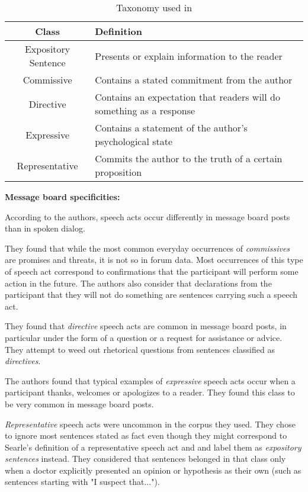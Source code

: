 \documentclass[11pt]{article}
\begin{document}
\begin{table}
	\begin{tabularx}{\textwidth}{c l}
		\toprule
		Class & Definition \\
		\midrule
		Expository Sentence & Presents or explain information to the reader \\
		\midrule
		Commissive & Contains a stated commitment from the author \\
		Directive & Contains an expectation that readers will do something as a response \\
		Expressive & Contains a statement of the author's psychological state \\
		Representative & Commits the author to the truth of a certain proposition \\
		\bottomrule
	\end{tabularx}
	\caption{Taxonomy used in \cite{qadir2011classifying}}
	\label{fig:qadirTaxonomies}
\end{table}

\vspace{0.5cm}
\textbf{Message board specificities:}
\vspace{0.1cm}

According to the authors, speech acts occur differently in message board posts than in spoken dialog. 

They found that while the most common everyday occurrences of \textit{commissives} are promises and threats, it is not so in forum data. Most occurrences of this type of speech act correspond to confirmations that the participant will perform some action in the future. The authors also consider that declarations from the participant that they will not do something are sentences carrying such a speech act.

They found that \textit{directive} speech acts are common in message board posts, in particular under the form of a question or a request for assistance or advice. They attempt to weed out rhetorical questions from sentences classified as \textit{directives}.

The authors found that typical examples of \textit{expressive} speech acts occur when a participant thanks, welcomes or apologizes to a reader. They found this class to be very common in message board posts.

\textit{Representative} speech acts were uncommon in the corpus they used. They chose to ignore most sentences stated as fact even though they might correspond to Searle's definition of a representative speech act and and label them as \textit{expository sentences} instead. They considered that sentences belonged in that class only when a doctor explicitly presented an opinion or hypothesis as their own (such as sentences starting with "I suspect that...").
\end{document}
